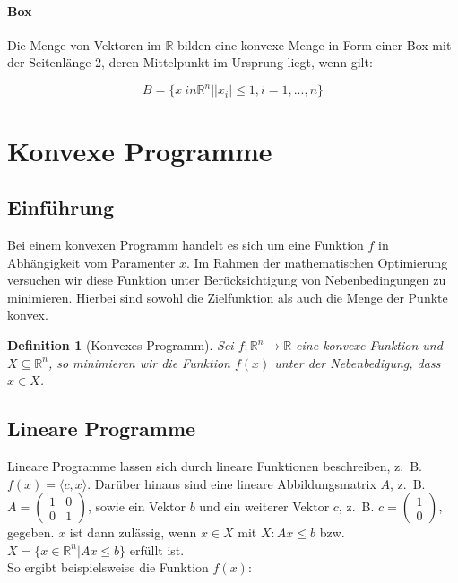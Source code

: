\documentclass[a4paper]{article}
\newtheorem{Def}{Definition}
\begin{document}
\begin{multicols}{2}
\paragraph{Box}

Die Menge von Vektoren im $\mathbb{R}$ bilden eine konvexe Menge in Form einer Box mit der Seitenlänge 2, deren Mittelpunkt im Ursprung liegt, wenn gilt:

\begin{equation*}
B = \{x \ in \mathbb{R}^{n} | |x_{i}| \le 1, i = 1, ..., n\}
\end{equation*}

\section{Konvexe Programme}

\subsection{Einführung}

Bei einem konvexen Programm handelt es sich um eine Funktion $f$ in Abhängigkeit vom Paramenter $x$. Im Rahmen der mathematischen Optimierung versuchen wir diese Funktion unter Berücksichtigung von Nebenbedingungen zu minimieren. Hierbei sind sowohl die Zielfunktion als auch die Menge der Punkte konvex.

\begin{Def}[Konvexes Programm]
Sei $f: \mathbb{R}^{n} \rightarrow \mathbb{R}$ eine konvexe Funktion und $X \subseteq \mathbb{R}^{n}$, so minimieren wir die Funktion $f(x)$ unter der Nebenbedigung, dass $x \in X$.
\end{Def}


\subsection{Lineare Programme}

Lineare Programme lassen sich durch lineare Funktionen beschreiben, z.~B. $f(x) = \langle c, x \rangle$. Darüber hinaus sind eine lineare Abbildungsmatrix $A$, z.~B. $A = \begin{pmatrix}1 & 0 \\ 0 & 1 \end{pmatrix}$, sowie ein Vektor $b$ und ein weiterer Vektor $c$, z.~B. $c = \begin{pmatrix}1 \\ 0 \end{pmatrix}$, gegeben. $x$ ist dann zulässig, wenn $x \in X$ mit $X: Ax \le b$ bzw. $X = \{x \in \mathbb{R}^{n} | Ax \le b\}$ erfüllt ist. \\
So ergibt beispielsweise die Funktion $f(x)$:


\end{multicols}
\end{document}
